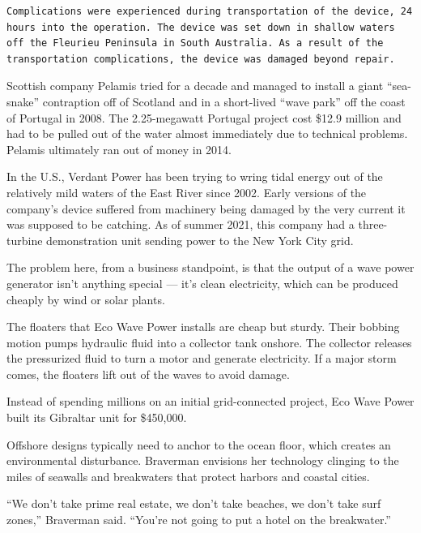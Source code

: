 \documentclass[
]{book}
\begin{document}
\begin{verbatim}
Complications were experienced during transportation of the device, 24 hours into the operation. The device was set down in shallow waters off the Fleurieu Peninsula in South Australia. As a result of the transportation complications, the device was damaged beyond repair.
\end{verbatim}

Scottish company Pelamis tried for a decade and managed to install a giant \hspace{0pt}``sea-snake'' contraption off of Scotland and in a short-lived \hspace{0pt}``wave park'' off the coast of Portugal in 2008. The 2.25-megawatt Portugal project cost \$12.9 million and had to be pulled out of the water almost immediately due to technical problems. Pelamis ultimately ran out of money in 2014.

In the U.S., Verdant Power has been trying to wring tidal energy out of the relatively mild waters of the East River since 2002. Early versions of the company's device suffered from machinery being damaged by the very current it was supposed to be catching. As of summer 2021, this company had a three-turbine demonstration unit sending power to the New York City grid.

The problem here, from a business standpoint, is that the output of a wave power generator isn't anything special --- it's clean electricity, which can be produced cheaply by wind or solar plants.

The floaters that Eco Wave Power installs are cheap but sturdy. Their bobbing motion pumps hydraulic fluid into a collector tank onshore. The collector releases the pressurized fluid to turn a motor and generate electricity. If a major storm comes, the floaters lift out of the waves to avoid damage.

Instead of spending millions on an initial grid-connected project, Eco Wave Power built its Gibraltar unit for \$450,000.

Offshore designs typically need to anchor to the ocean floor, which creates an environmental disturbance. Braverman envisions her technology clinging to the miles of seawalls and breakwaters that protect harbors and coastal cities.

``We don't take prime real estate, we don't take beaches, we don't take surf zones,'' Braverman said. \hspace{0pt}``You're not going to put a hotel on the breakwater.''
\end{document}
